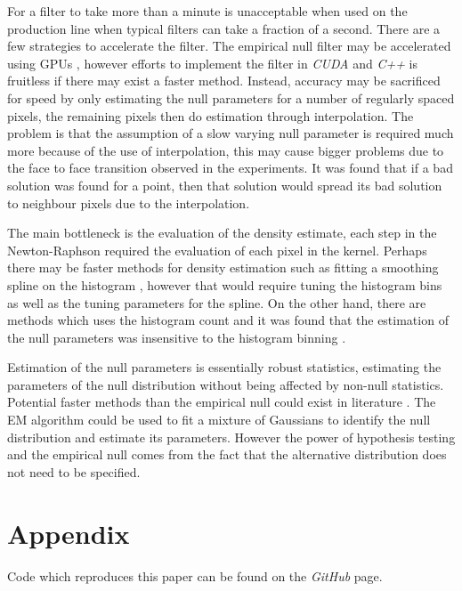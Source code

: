 \documentclass{article}
\begin{document}
For a filter to take more than a minute is unacceptable when used on the production line when typical filters can take a fraction of a second. There are a few strategies to accelerate the filter. The empirical null filter may be accelerated using GPUs \citep{eklund2013medical, hwu2011gpu, yang2008parallel}, however efforts to implement the filter in \emph{CUDA} and \emph{C++} is fruitless if there may exist a faster method. Instead, accuracy may be sacrificed for speed by only estimating the null parameters for a number of regularly spaced pixels, the remaining pixels then do estimation through interpolation. The problem is that the assumption of a slow varying null parameter is required much more because of the use of interpolation, this may cause bigger problems due to the face to face transition observed in the experiments. It was found that if a bad solution was found for a point, then that solution would spread its bad solution to neighbour pixels due to the interpolation.

The main bottleneck is the evaluation of the density estimate, each step in the Newton-Raphson required the evaluation of each pixel in the kernel. Perhaps there may be faster methods for density estimation such as fitting a smoothing spline on the histogram \citep{efron2004large}, however that would require tuning the histogram bins as well as the tuning parameters for the spline. On the other hand, there are methods which uses the histogram count and it was found that the estimation of the null parameters was insensitive to the histogram binning \citep{schwartzman2008empirical}.

Estimation of the null parameters is essentially robust statistics, estimating the parameters of the null distribution without being affected by non-null statistics. Potential faster methods than the empirical null could exist in literature \citep{hampel1986robust, huber2009robust, jewson2018principles, maronna2006robust, rousseeuw1987robust}. The EM algorithm \citep{bishop2006pattern, dempster1977maximum} could be used to fit a mixture of Gaussians to identify the null distribution and estimate its parameters. However the power of hypothesis testing and the empirical null comes from the fact that the alternative distribution does not need to be specified.

\section{Appendix}
Code which reproduces this paper can be found on the \emph{GitHub} page.
\end{document}

